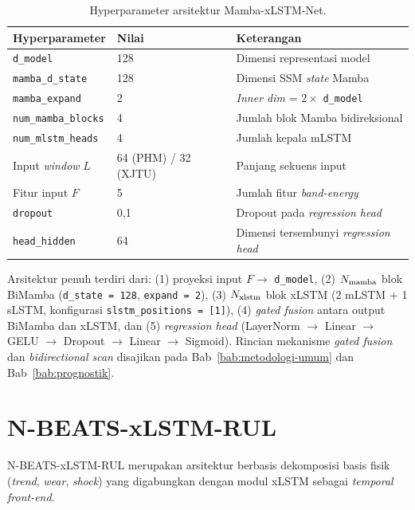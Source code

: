 \begin{table}[ht]
  \centering
  \caption{Hyperparameter arsitektur Mamba-xLSTM-Net.}
  \label{tab:lampB_mamba_xlstm_arch}
  \small
  \begin{tabular}{@{}lll@{}}
    \toprule
    \textbf{Hyperparameter} & \textbf{Nilai} & \textbf{Keterangan} \\
    \midrule
    \texttt{d\_model} & 128 & Dimensi representasi model \\
    \texttt{mamba\_d\_state} & 128 & Dimensi SSM \emph{state} Mamba \\
    \texttt{mamba\_expand} & 2 & \emph{Inner dim} = $2 \times$ \texttt{d\_model} \\
    \texttt{num\_mamba\_blocks} & 4 & Jumlah blok Mamba bidireksional \\
    \texttt{num\_mlstm\_heads} & 4 & Jumlah kepala mLSTM \\
    Input \emph{window} $L$ & 64 (PHM) / 32 (XJTU) & Panjang sekuens input \\
    Fitur input $F$ & 5 & Jumlah fitur \emph{band-energy} \\
    \texttt{dropout} & 0,1 & Dropout pada \emph{regression head} \\
    \texttt{head\_hidden} & 64 & Dimensi tersembunyi \emph{regression head} \\
    \bottomrule
  \end{tabular}
\end{table}

Arsitektur penuh terdiri dari: (1) proyeksi input $F \to$ \texttt{d\_model},
(2) $N_{\rm mamba}$ blok BiMamba (\texttt{d\_state = 128}, \texttt{expand = 2}),
(3) $N_{\rm xlstm}$ blok xLSTM (2 mLSTM + 1 sLSTM, konfigurasi \texttt{slstm\_positions = [1]}),
(4) \emph{gated fusion} antara output BiMamba dan xLSTM, dan
(5) \emph{regression head} (LayerNorm $\to$ Linear $\to$ GELU $\to$ Dropout $\to$ Linear $\to$ Sigmoid).
Rincian mekanisme \emph{gated fusion} dan \emph{bidirectional scan} disajikan
pada Bab~\ref{bab:metodologi-umum} dan Bab~\ref{bab:prognostik}.

\section{N-BEATS-xLSTM-RUL}
\label{lamp:hparam_nbeats_xlstm}

N-BEATS-xLSTM-RUL merupakan arsitektur berbasis dekomposisi basis fisik
(\emph{trend}, \emph{wear}, \emph{shock}) yang digabungkan dengan modul
xLSTM sebagai \emph{temporal front-end}.

